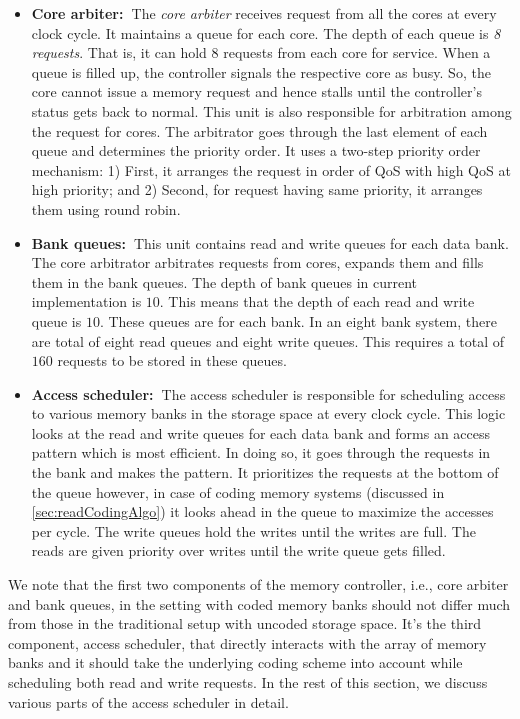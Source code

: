 \begin{itemize}
\item \textbf{Core arbiter:~}The {\em core arbiter} receives request from all the cores at every clock cycle.  
It maintains a queue for each core. The depth of each queue is {\em 8 requests}.  
That is, it can hold 8 requests from each core for service. When a queue is 
filled up, the controller signals the respective core as busy. So, the core 
cannot issue a memory request and hence stalls until the controller's status 
gets back to normal. This unit is also responsible for arbitration among the 
request for cores. The arbitrator goes through the last element of each queue 
and determines the priority order. It uses a two-step priority order mechanism:
1) First, it arranges the request in order of QoS with high QoS at high 
priority; and  2) {Second}, for request having same priority, it arranges them using 
round robin.
\item \textbf{Bank queues:~}This unit contains read  and write queues for each data bank. The core arbitrator arbitrates requests from 
cores, expands them and fills them in the bank queues. The depth of bank queues 
in current implementation is $10$. This means that the depth of each read 
and write queue is $10$. These queues are for each bank. In an eight bank system, 
there are total of eight read queues and eight write queues. This requires a 
total of $160$ requests to be stored in these queues.
\item \textbf{Access scheduler:~}The access scheduler is responsible for scheduling access to
various memory banks in the storage space at every clock cycle.  This logic looks at the read and write queues for 
each data bank and forms an access pattern which is most efficient. In doing so, it 
goes through the requests in the bank and makes the pattern. It prioritizes the
requests at the bottom of the queue however, in case of coding memory systems 
(discussed in \ref{sec:readCodingAlgo}) it looks ahead in the queue to maximize 
the accesses per cycle. The write queues hold the writes until the writes are 
full. The reads are given priority over writes until the write queue gets 
filled.
\end{itemize}

{\color{red} We note that the first two components of the memory controller, i.e., core arbiter and bank queues, in the setting with coded memory banks should not differ much from those in the traditional setup with uncoded storage space. It's the third component, access scheduler, that directly interacts with the array of memory banks and it should take the underlying coding scheme into account while scheduling both read and write requests.} In the rest of this section, we discuss various parts of the access scheduler in detail.

